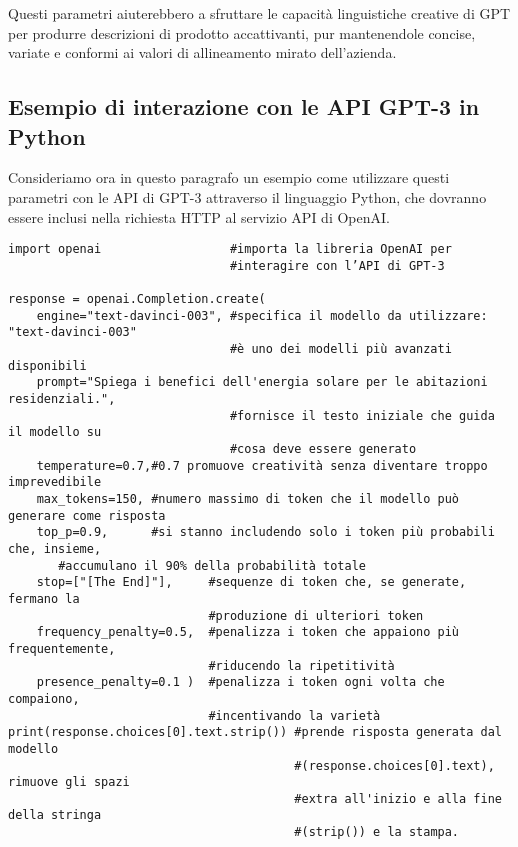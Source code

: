         Questi parametri aiuterebbero a sfruttare le capacità linguistiche creative di GPT per produrre descrizioni di prodotto accattivanti, pur mantenendole concise, variate e conformi ai valori di allineamento mirato dell'azienda.
        
    \subsection{Esempio di interazione con le API GPT-3 in Python}
        Consideriamo ora in questo paragrafo un esempio come utilizzare questi parametri con le API di GPT-3 attraverso il linguaggio Python, che dovranno essere inclusi nella richiesta HTTP al servizio API di OpenAI.

        \begin{Verbatim}[frame=single]
import openai                  #importa la libreria OpenAI per
                               #interagire con l’API di GPT-3

response = openai.Completion.create(
    engine="text-davinci-003", #specifica il modello da utilizzare: "text-davinci-003"
                               #è uno dei modelli più avanzati disponibili
    prompt="Spiega i benefici dell'energia solare per le abitazioni residenziali.",
                               #fornisce il testo iniziale che guida il modello su
                               #cosa deve essere generato
    temperature=0.7,#0.7 promuove creatività senza diventare troppo imprevedibile
    max_tokens=150,	#numero massimo di token che il modello può generare come risposta
    top_p=0.9,      #si stanno includendo solo i token più probabili che, insieme,
       #accumulano il 90% della probabilità totale
    stop=["[The End]"],    	#sequenze di token che, se generate, fermano la
                           	#produzione di ulteriori token
    frequency_penalty=0.5,	#penalizza i token che appaiono più frequentemente,
                           	#riducendo la ripetitività
    presence_penalty=0.1 )	#penalizza i token ogni volta che compaiono,
                          	#incentivando la varietà
print(response.choices[0].text.strip()) #prende risposta generata dal modello
                                        #(response.choices[0].text), rimuove gli spazi
                                        #extra all'inizio e alla fine della stringa
                                        #(strip()) e la stampa.
        \end{Verbatim}

